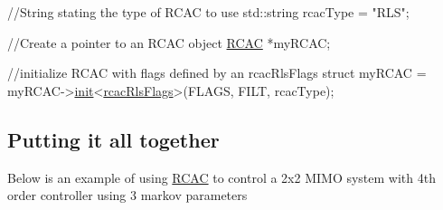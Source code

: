 \begin{DoxyCode}
\textcolor{comment}{//String stating the type of RCAC to use}
std::string rcacType = \textcolor{stringliteral}{"RLS"};

\textcolor{comment}{//Create a pointer to an RCAC object}
\hyperlink{class_r_c_a_c}{RCAC} *myRCAC;

\textcolor{comment}{//initialize RCAC with flags defined by an rcacRlsFlags struct}
myRCAC = myRCAC->\hyperlink{class_r_c_a_c_af7b7133b676886d5010be725291c1a1d}{init}<\hyperlink{structrcac_rls_flags}{rcacRlsFlags}>(FLAGS, FILT, rcacType);
\end{DoxyCode}


\subsection*{Putting it all together }

Below is an example of using \hyperlink{class_r_c_a_c}{R\+C\+AC} to control a 2x2 M\+I\+MO system with 4th order controller using 3 markov parameters



